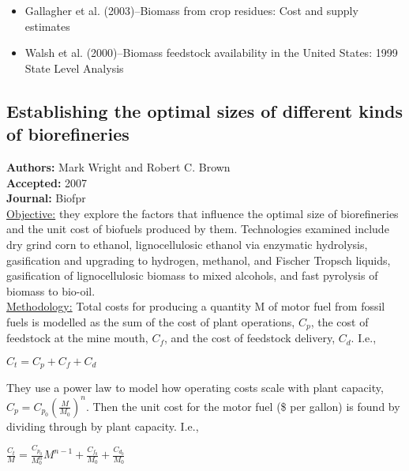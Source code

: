 \documentclass{article}\usepackage[]{graphicx}\usepackage[]{color}
\begin{document}
\begin{itemize}
\item Gallagher et al. (2003)--Biomass from crop residues: Cost and supply estimates
\item Walsh et al. (2000)--Biomass feedstock availability in the United States: 1999 State Level Analysis
\end{itemize}

\subsection{Establishing the optimal sizes of different kinds of biorefineries}
\textbf{Authors:} Mark Wright and Robert C. Brown \\
\textbf{Accepted:} 2007 \\
\textbf{Journal:} Biofpr \\

\underline{Objective:} they explore the factors that influence the optimal size of biorefineries and the unit cost of biofuels produced by them.  Technologies examined include dry grind corn to ethanol, lignocellulosic ethanol via enzymatic hydrolysis, gasification and upgrading to hydrogen, methanol, and Fischer Tropsch liquids, gasification of lignocellulosic biomass to mixed alcohols, and fast pyrolysis of biomass to bio-oil. \\

\underline{Methodology:} Total costs for producing a quantity M of motor fuel from fossil fuels is modelled as the sum of the cost of plant operations, $C_p$, the cost of feedstock at the mine mouth, $C_f$, and the cost of feedstock delivery, $C_d$.  I.e., \\

\begin{centering}
$C_t = C_p + C_f+ C_d$ \\
\end{centering}

They use a power law to model how operating costs scale with plant capacity, $C_p = C_{p_0}(\frac{M}{M_0})^n$.  Then the unit cost for the motor fuel (\$ per gallon) is found by dividing through by plant capacity.  I.e., \\

\begin{centering}
$\frac{C_t}{M} = \frac{C_{p_0}}{M_0^n}M^{n-1} + \frac{C_{f_0}}{M_0} + \frac{C_{d_0}}{M_0}$ \\
\end{centering}
\end{document}
